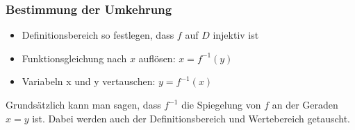 \subsubsection*{Bestimmung der Umkehrung}
\begin{itemize}
\item Definitionsbereich so festlegen, dass $f$ auf $D$ injektiv ist
\item Funktionsgleichung nach $x$ auflösen: $x=f^{-1}(y)$
\item Variabeln x und y vertauschen: $y=f^{-1}(x)$
\end{itemize}
Grundsätzlich kann man sagen, dass $f^{-1}$ die Spiegelung von $f$
an der Geraden $x=y$ ist. Dabei werden auch der Definitionsbereich
und Wertebereich getauscht.
